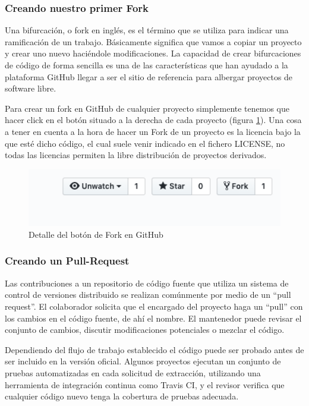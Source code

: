 \subsubsection{Creando nuestro primer Fork}

Una bifurcación, o fork en inglés, es el término que se utiliza para indicar una ramificación de un trabajo. Básicamente significa que vamos a copiar un proyecto y crear uno nuevo haciéndole modificaciones. La capacidad de crear bifurcaciones de código de forma sencilla es una de las características que han ayudado a la plataforma GitHub llegar a ser el sitio de referencia para albergar proyectos de software libre.

\bigskip
Para crear un fork en GitHub de cualquier proyecto simplemente tenemos que hacer click en el botón situado a la derecha de cada proyecto (figura \ref{fig:git_fork}). Una cosa a tener en cuenta a la hora de hacer un Fork de un proyecto es la licencia bajo la que esté dicho código, el cual suele venir indicado en el fichero LICENSE, no todas las licencias permiten la libre distribución de proyectos derivados.

\begin{figure}[H]
\centering
\includegraphics[width=1.0\textwidth]{../images/git_fork}
\caption{Detalle del botón de Fork en GitHub}
\label{fig:git_fork}
\end{figure}

\subsubsection{Creando un Pull-Request}

Las contribuciones a un repositorio de código fuente que utiliza un sistema de control de versiones distribuido se realizan comúnmente por medio de un ``pull request''. El colaborador solicita que el encargado del proyecto haga un ``pull'' con los cambios en el código fuente, de ahí el nombre. El mantenedor puede revisar el conjunto de cambios, discutir modificaciones potenciales o mezclar el código.

Dependiendo del flujo de trabajo establecido el código puede ser probado antes de ser incluido en la versión oficial. Algunos proyectos ejecutan un conjunto de pruebas automatizadas en cada solicitud de extracción, utilizando una herramienta de integración continua como Travis CI, y el revisor verifica que cualquier código nuevo tenga la cobertura de pruebas adecuada.


